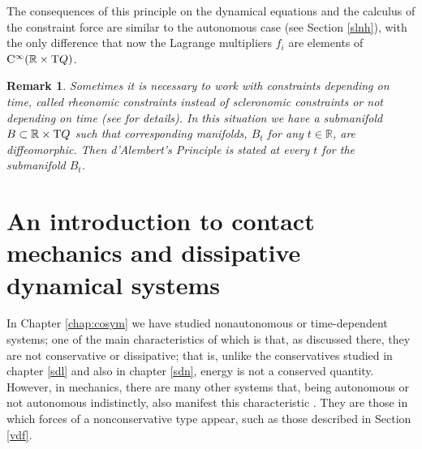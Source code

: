 \documentclass[12pt]{report}
\newtheorem{remark}[teor]{Remark}
\def\Real{\mathbb{R}}
\def\Tan{{\rm T}}
\def\Cinfty{{\rm C}^\infty}
\begin{document}
The consequences of this principle on the dynamical equations and the calculus of the constraint force are similar to the autonomous case
(see Section \ref{slnh}), with the only difference that now the Lagrange multipliers $f_i$ are elements of $\Cinfty (\Real\times\Tan Q)$.

\begin{remark}{\rm  Sometimes it is necessary to work with constraints depending on time, called  \textit{rheonomic} constraints instead of \textit{scleronomic} constraints  or not depending on time (see  \cite{Sch-2005} for details). In this situation we have a submanifold $B\subset\Real\times\Tan Q$ such that corresponding manifolds, $B_{t}$ for any $t\in\Real$, are diffeomorphic. Then d'Alembert's Principle is stated at every $t$ for the submanifold $B_{t}$. 
}\end{remark}




\chapter{An introduction to contact mechanics and dissipative dynamical systems}
\label{chap:contactmech}


In Chapter \ref{chap:cosym} we have studied nonautonomous or time-dependent systems;
one of the main characteristics of which is that, as discussed there, they are not conservative or dissipative; 
that is, unlike the conservatives studied in chapter \ref{sdl} and also in chapter \ref{sdn}, energy is not a conserved quantity. 
However, in mechanics, there are many other systems that, 
being autonomous or not autonomous indistinctly, also manifest this characteristic \cite{Galley-2013,Ra-2006}. 
They are those in which forces of a nonconservative type appear, such as those described in Section \ref{vdf}.
\end{document}
